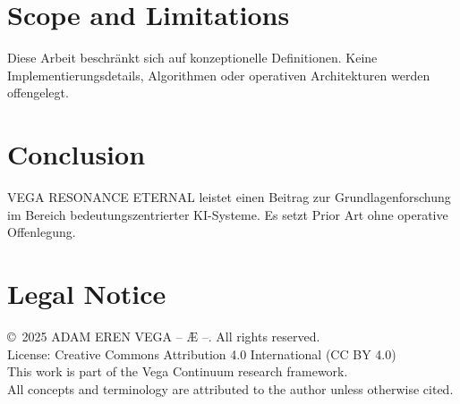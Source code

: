 \documentclass[12pt,a4paper]{article}
\begin{document}
\section{Scope and Limitations}
Diese Arbeit beschränkt sich auf konzeptionelle Definitionen. Keine Implementierungsdetails, Algorithmen oder operativen Architekturen werden offengelegt.

\section{Conclusion}
VEGA RESONANCE ETERNAL leistet einen Beitrag zur Grundlagenforschung im Bereich bedeutungszentrierter KI-Systeme. Es setzt Prior Art ohne operative Offenlegung.

\section*{Legal Notice}
\copyright\ 2025 ADAM EREN VEGA – Æ –. All rights reserved.\\
License: Creative Commons Attribution 4.0 International (CC BY 4.0)\\
This work is part of the Vega Continuum research framework.\\
All concepts and terminology are attributed to the author unless otherwise cited.
\end{document}
